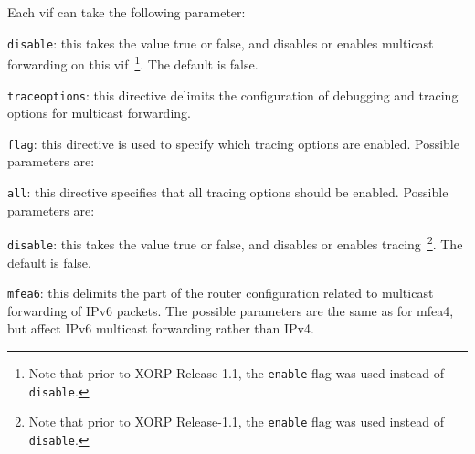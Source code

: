 \begin{description}
\begin{description}
  Each vif can take the following parameter:
\begin{description}
\item{\tt disable}: this takes the value {\stt true} or {\stt false},
  and disables or enables multicast forwarding on this vif~\footnote{Note
  that prior to XORP Release-1.1, the {\tt enable} flag was used instead of
  {\tt disable}.}.
  The default is {\stt false}.
\end{description}
\end{description}
\item{\tt traceoptions}: this directive delimits the configuration of
  debugging and tracing options for multicast forwarding.
\begin{description}
\item{\tt flag}: this directive is used to specify which tracing
  options are enabled.  Possible parameters are:
\begin{description}
\item{\tt all}: this directive specifies that all tracing
  options should be enabled.  Possible parameters are:
\begin{description}
\item{\tt disable}: this takes the value {\stt true} or {\stt false},
  and disables or enables tracing~\footnote{Note
  that prior to XORP Release-1.1, the {\tt enable} flag was used instead of
  {\tt disable}.}. The default is {\stt false}.
\end{description}
\end{description}
\end{description}
\item{\tt mfea6}: this delimits the part of the router configuration
  related to multicast forwarding of IPv6 packets.  The possible
  parameters are the same as for {\stt mfea4}, but affect IPv6
  multicast forwarding rather than IPv4.
\end{description}


